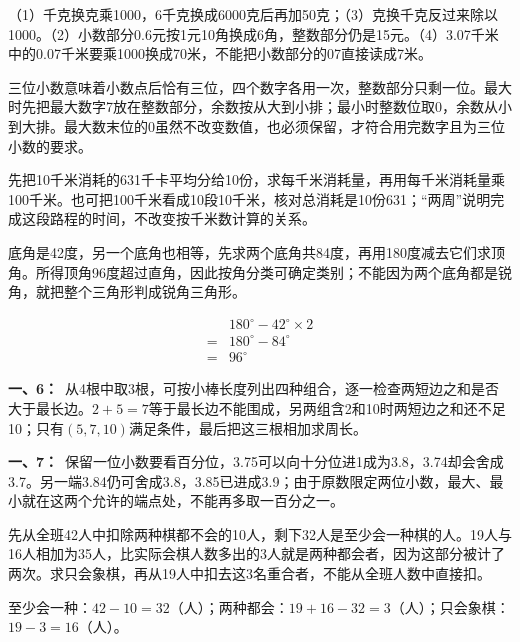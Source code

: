 \documentclass[multi=snippet,border=0pt]{standalone}
\newenvironment{snippet}[3]{\begin{minipage}{#1bp}\color{answerred}\fontsize{#2}{#3}\selectfont\raggedright}{\end{minipage}}
\begin{document}
\begin{snippet}{505}{11.5}{14}（1）千克换克乘1000，6千克换成6000克后再加50克；（3）克换千克反过来除以1000。（2）小数部分0.6元按1元10角换成6角，整数部分仍是15元。（4）3.07千米中的0.07千米要乘1000换成70米，不能把小数部分的07直接读成7米。\end{snippet}
\begin{snippet}{505}{11.5}{14}三位小数意味着小数点后恰有三位，四个数字各用一次，整数部分只剩一位。最大时先把最大数字7放在整数部分，余数按从大到小排；最小时整数位取0，余数从小到大排。最大数末位的0虽然不改变数值，也必须保留，才符合用完数字且为三位小数的要求。\end{snippet}
\begin{snippet}{505}{11.5}{14}先把10千米消耗的631千卡平均分给10份，求每千米消耗量，再用每千米消耗量乘100千米。也可把100千米看成10段10千米，核对总消耗是10份631；“两周”说明完成这段路程的时间，不改变按千米数计算的关系。\end{snippet}
\begin{snippet}{505}{11.5}{14}底角是42度，另一个底角也相等，先求两个底角共84度，再用180度减去它们求顶角。所得顶角96度超过直角，因此按角分类可确定类别；不能因为两个底角都是锐角，就把整个三角形判成锐角三角形。\par \[\begin{aligned}&180^\circ-42^\circ\times2\\={}&180^\circ-84^\circ\\={}&96^\circ\end{aligned}\]\end{snippet}
\begin{snippet}{505}{11.5}{14}\textbf{一、6：}\ 从4根中取3根，可按小棒长度列出四种组合，逐一检查两短边之和是否大于最长边。\(2+5=7\)等于最长边不能围成，另两组含2和10时两短边之和还不足10；只有\((5,7,10)\)满足条件，最后把这三根相加求周长。\end{snippet}
\begin{snippet}{505}{11.5}{14}\textbf{一、7：}\ 保留一位小数要看百分位，3.75可以向十分位进1成为3.8，3.74却会舍成3.7。另一端3.84仍可舍成3.8，3.85已进成3.9；由于原数限定两位小数，最大、最小就在这两个允许的端点处，不能再多取一百分之一。\end{snippet}
\begin{snippet}{505}{11.5}{14}先从全班42人中扣除两种棋都不会的10人，剩下32人是至少会一种棋的人。19人与16人相加为35人，比实际会棋人数多出的3人就是两种都会者，因为这部分被计了两次。求只会象棋，再从19人中扣去这3名重合者，不能从全班人数中直接扣。\par 至少会一种：\(42-10=32\)（人）；两种都会：\(19+16-32=3\)（人）；只会象棋：\(19-3=16\)（人）。\end{snippet}
\end{document}
